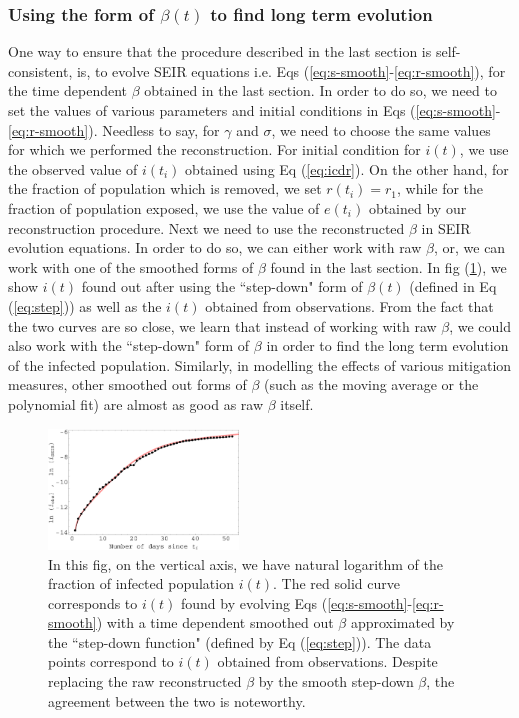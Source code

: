 \documentclass[aps,prd,10pt,twocolumn,nofootinbib]{revtex4-2}
\begin{document}

\subsubsection{Using the form of $\beta(t)$ to find long term evolution}

One way to ensure that the procedure described in the last section is self-consistent, is, to evolve SEIR equations i.e. Eqs (\ref{eq:s-smooth}-\ref{eq:r-smooth}), for the time dependent $\beta$ obtained in the last section. 
In order to do so, we need to set the values of various parameters and initial conditions in Eqs (\ref{eq:s-smooth}-\ref{eq:r-smooth}).
Needless to say, for $\gamma$ and $\sigma$, we need to choose the same values for which we performed the reconstruction. 
For initial condition for $i(t)$, we use the observed value of $i (t_i)$ obtained using Eq (\ref{eq:icdr}). 
On the other hand, for the fraction of population which is removed, we set $r(t_i) = r_1$, while for the fraction of population exposed, we use the value of $e(t_i)$ obtained by our reconstruction procedure. Next we need to use the reconstructed $\beta$ in SEIR evolution equations. In order to do so, we can either work with raw $\beta$, or, we can work with one of the smoothed forms of $\beta$ found in the last section. 
In fig (\ref{seir_step}), we show $i(t)$ found out after using the ``step-down" form of $\beta (t)$ (defined in Eq (\ref{eq:step})) as well as the $i(t)$ obtained from observations. From the fact that the two curves are so close, we learn that instead of working with raw $\beta$, we could also work with the ``step-down" form of $\beta$ in order to find the long term evolution of the infected population. 
Similarly, in modelling the effects of various mitigation measures, other smoothed out forms of $\beta$ (such as the moving average or the polynomial fit) are almost as good as raw $\beta$ itself.

\begin{figure}
  \includegraphics[width = 0.45\textwidth]{i-SEIR.pdf}
  \caption
 {
  In this fig, on the vertical axis, we have natural logarithm of the fraction of infected population $i(t)$. The red solid curve corresponds to $i(t)$ found by evolving Eqs (\ref{eq:s-smooth}-\ref{eq:r-smooth}) with a time dependent smoothed out $\beta$ approximated by the ``step-down function" (defined by Eq (\ref{eq:step})). The data points correspond to $i(t)$ obtained from observations. Despite replacing the raw reconstructed $\beta$ by the smooth step-down $\beta$, the agreement between the two is noteworthy.
  }
  \label{seir_step}
\end{figure}
\end{document}
